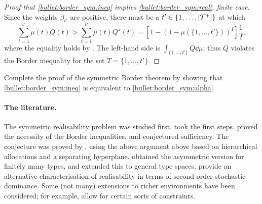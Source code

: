 \begin{proof}[Proof that \ref{bullet:border_sym:ineq} implies \ref{bullet:border_sym:real}, finite case]
	Since the weights $\beta_{t'}$ are positive,
	there must be a $t' \in \{1,\dots,\abs*{\mathcal{T}^+}\}$ at which
	\begin{equation*}
		\sum_{t=1}^{t'} \mu(t) Q(t)
		> \sum_{t=1}^{t'} \mu(t) Q^\star(t) 
		= \left[ 1 - \left( 1 - \mu(\{1,\dots,t'\}) \right)^I \right]
		\frac{1}{I} ,
	\end{equation*}
	where the equality holds by .
	The left-hand side
	is $\int_{\{1,\dots,t'\}} Q \dd \mu$;
	thus $Q$ violates the Border inequality for the set $T = \{1,\dots,t'\}$.
\end{proof}

\begin{exercise}
	\label{exercise:border_ineq_alpha}
	Complete the proof of the symmetric Border theorem by showing that \ref{bullet:border_sym:ineq} is equivalent to \ref{bullet:border_sym:alpha}.
\end{exercise}


\paragraph{The literature.}
The symmetric realisability problem was studied first.
\textcite{MaskinRiley1984} took the first steps.
\textcite{Matthews1984} proved the necessity of the Border inequalities, and conjectured sufficiency.
The conjecture was proved by \textcite{Border1991}, using the above argument above based on hierarchical allocations and a separating hyperplane.
\textcite{Border2007} obtained the asymmetric version for finitely many types,
and \textcite{Mierendorff2011} extended this to general type spaces.
\textcite{HartReny2015border} provide an alternative characterisation of realisability in terms of second-order stochastic dominance.
Some (not many) extensions to richer environments have been considered; for example, \textcite{CheKimMierendorff2013} allow for certain sorts of constraints.


